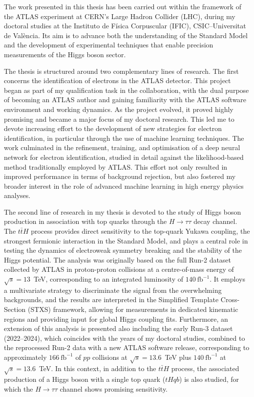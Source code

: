 The work presented in this thesis has been carried out within the framework of the ATLAS experiment at CERN's Large Hadron Collider (LHC), during my doctoral studies at the Instituto de Física Corpuscular (IFIC), CSIC–Universitat de València. Its aim is to advance both the understanding of the Standard Model and the development of experimental techniques that enable precision measurements of the Higgs boson sector.

The thesis is structured around two complementary lines of research. The first concerns the identification of electrons in the ATLAS detector. This project began as part of my qualification task in the collaboration, with the dual purpose of becoming an ATLAS author and gaining familiarity with the ATLAS software environment and working dynamics. As the project evolved, it proved highly promising and became a major focus of my doctoral research. This led me to devote increasing effort to the development of new strategies for electron identification, in particular through the use of machine learning techniques. The work culminated in the refinement, training, and optimisation of a deep neural network for electron identification, studied in detail against the likelihood-based method traditionally employed by ATLAS. This effort not only resulted in improved performance in terms of background rejection, but also fostered my broader interest in the role of advanced machine learning in high energy physics analyses.

The second line of research in my thesis is devoted to the study of Higgs boson production in association with top quarks through the $H\to\tau\tau$ decay channel. The $t\bar{t}H$ process provides direct sensitivity to the top-quark Yukawa coupling, the strongest fermionic interaction in the Standard Model, and plays a central role in testing the dynamics of electroweak symmetry breaking and the stability of the Higgs potential. The analysis was originally based on the full Run-2 dataset collected by ATLAS in proton-proton collisions at a centre-of-mass energy of $\sqrt{s} = 13$~TeV, corresponding to an integrated luminosity of $140~\mathrm{fb}^{-1}$. It employs a multivariate strategy to discriminate the signal from the overwhelming backgrounds, and the results are interpreted in the Simplified Template Cross-Section (STXS) framework, allowing for measurements in dedicated kinematic regions and providing input for global Higgs coupling fits. Furthermore, an extension of this analysis is presented also including the early Run-3 dataset (2022–2024), which coincides with the years of my doctoral studies, combined to the reprocessed Run-2 data with a new ATLAS software release, corresponding to approximately $166~\mathrm{fb}^{-1}$ of $pp$ collisions at $\sqrt{s} = 13.6$~TeV plus $140~\mathrm{fb}^{-1}$ at $\sqrt{s} = 13.6$~TeV. In this context, in addition to the $t\bar{t}H$ process, the associated production of a Higgs boson with a single top quark ($tHqb$) is also studied, for which the $H \to \tau\tau$ channel shows promising sensitivity.

